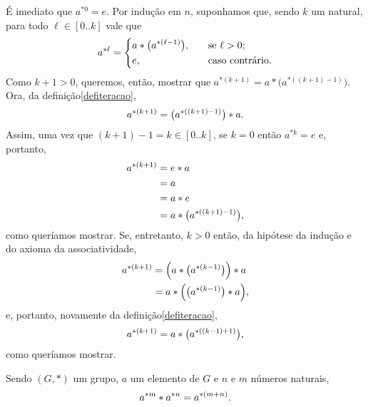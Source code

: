 \begin{dem}
  É imediato que $a^{\ast 0} = e$. Por indução em $n$, suponhamos que,
  sendo $k$ um natural, para todo $\ell\in[0..k]$ vale que
  \begin{equation*}
    a^{\ast \ell} = \left\{
    \begin{aligned}
      &a\ast
      \bigl(a^{\ast(\ell-1)}\bigr)\mathrm{,}&\quad&\text{se $\ell>0$;}\\
      &e\mathrm{,}&\quad&\text{caso contrário.}
    \end{aligned}
    \right.
  \end{equation*}
  Como $k+1>0$, queremos, então, mostrar que
  $a^{\ast (k+1)} = a\ast\bigl(a^{\ast((k+1)-1)}\bigr)$. Ora, da
  definição\xspace\ref{defiteracao},
  \begin{equation*}
    a^{\ast (k+1)} = \bigl(a^{\ast((k+1)-1)}\bigr)\ast a\mathrm{.}
  \end{equation*}
  Assim, uma vez que $(k+1)-1=k\in[0..k]$, se $k=0$ então $a^{\ast k}=e$
  e, portanto,
  \begin{equation*}
    \begin{aligned}
      a^{\ast (k+1)} &= e\ast a\\
                     &= a\\
                     &= a\ast e\\
                     &= a\ast\bigl(a^{\ast((k+1)-1)}\bigr)\mathrm{,}
    \end{aligned}
  \end{equation*}
  como queríamos mostrar. Se, entretanto, $k>0$ então, da hipótese da
  indução e do axioma da associatividade,
  \begin{equation*}
    \begin{aligned}
      a^{\ast (k+1)} &= \Bigl(a\ast\bigl(a^{\ast(k-1)}\bigr)\Bigr)
                        \ast a\\
             &= a\ast\Bigl(\bigl(a^{\ast(k-1)}\bigr)\ast a\Bigr)\mathrm{,}
    \end{aligned}
  \end{equation*}
  e, portanto, novamente da definição\xspace\ref{defiteracao},
  \begin{equation*}
    a^{\ast (k+1)} = a\ast\bigl(a^{\ast((k-1)+1)}\bigr)\mathrm{,}
  \end{equation*}
  como queríamos mostrar.
\end{dem}

\begin{Propr}\label{apotm-apotn-apotmn}
  Sendo $(G,\ast)$ um grupo, $a$ um elemento de $G$ e
  $n$ e $m$ números naturais,
  \begin{equation*}
    a^{\ast m}\ast a^{\ast n} = a^{\ast (m+n)}\mathrm{.}
  \end{equation*}
\end{Propr}

